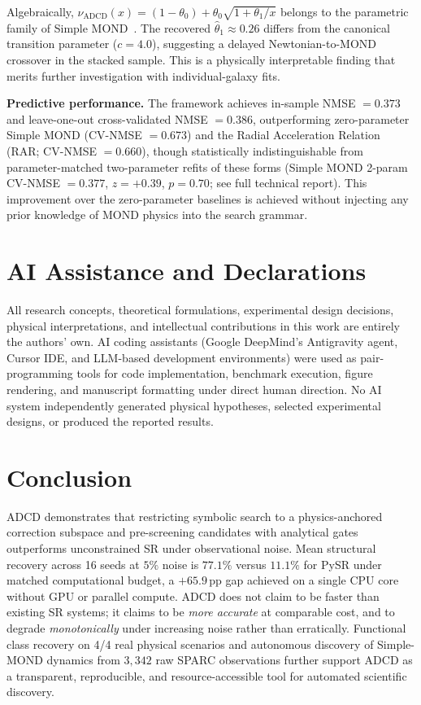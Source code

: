 \documentclass{article}
\begin{document}
Algebraically, $\nu_{\text{ADCD}}(x) = (1-\theta_0) + \theta_0\sqrt{1+\theta_1/x}$ belongs to the parametric family of Simple MOND~\cite{famaey2005simple}. The recovered $\hat{\theta}_1 \approx 0.26$ differs from the canonical transition parameter ($c=4.0$), suggesting a delayed Newtonian-to-MOND crossover in the stacked sample. This is a physically interpretable finding that merits further investigation with individual-galaxy fits.

\textbf{Predictive performance.} The framework achieves in-sample NMSE $= 0.373$ and leave-one-out cross-validated NMSE $= 0.386$, outperforming zero-parameter Simple MOND (CV-NMSE $= 0.673$) and the Radial Acceleration Relation (RAR; CV-NMSE $= 0.660$), though statistically indistinguishable from parameter-matched two-parameter refits of these forms (Simple MOND 2-param CV-NMSE $= 0.377$, $z = +0.39$, $p = 0.70$; see full technical report). This improvement over the zero-parameter baselines is achieved without injecting any prior knowledge of MOND physics into the search grammar.

\section*{AI Assistance and Declarations}

All research concepts, theoretical formulations, experimental design decisions, physical interpretations, and intellectual contributions in this work are entirely the authors' own. AI coding assistants (Google DeepMind's Antigravity agent, Cursor IDE, and LLM-based development environments) were used as pair-programming tools for code implementation, benchmark execution, figure rendering, and manuscript formatting under direct human direction. No AI system independently generated physical hypotheses, selected experimental designs, or produced the reported results.

\section{Conclusion}
\label{sec:conclusion}

ADCD demonstrates that restricting symbolic search to a physics-anchored correction subspace and pre-screening candidates with analytical gates outperforms unconstrained SR under observational noise. Mean structural recovery across 16 seeds at $5\%$ noise is $77.1\%$ versus $11.1\%$ for PySR under matched computational budget, a $+65.9$\,pp gap achieved on a single CPU core without GPU or parallel compute. ADCD does not claim to be faster than existing SR systems; it claims to be \emph{more accurate} at comparable cost, and to degrade \emph{monotonically} under increasing noise rather than erratically. Functional class recovery on 4/4 real physical scenarios and autonomous discovery of Simple-MOND dynamics from $3{,}342$ raw SPARC observations further support ADCD as a transparent, reproducible, and resource-accessible tool for automated scientific discovery.
\end{document}
